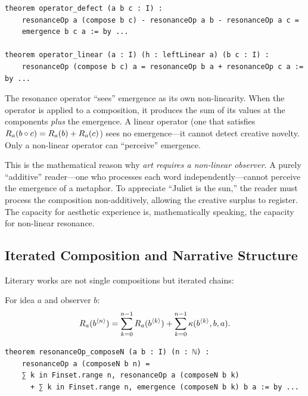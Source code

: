 \begin{lstlisting}[caption={Operator defect (IDT\_v3\_Emergence.lean)}]
theorem operator_defect (a b c : I) :
    resonanceOp a (compose b c) - resonanceOp a b - resonanceOp a c =
    emergence b c a := by ...

theorem operator_linear (a : I) (h : leftLinear a) (b c : I) :
    resonanceOp (compose b c) a = resonanceOp b a + resonanceOp c a := by ...
\end{lstlisting}

\begin{interpretation}
The resonance operator ``sees'' emergence as its own non-linearity. When the
operator is applied to a composition, it produces the sum of its values at
the components \emph{plus} the emergence. A linear operator (one that satisfies
$R_a(b \circ c) = R_a(b) + R_a(c)$) sees no emergence---it cannot detect
creative novelty. Only a non-linear operator can ``perceive'' emergence.

This is the mathematical reason why \emph{art requires a non-linear observer}.
A purely ``additive'' reader---one who processes each word independently---cannot
perceive the emergence of a metaphor. To appreciate ``Juliet is the sun,'' the
reader must process the composition non-additively, allowing the creative
surplus to register. The capacity for aesthetic experience is, mathematically
speaking, the capacity for non-linear resonance.
\end{interpretation}

\subsection{Iterated Composition and Narrative Structure}

Literary works are not single compositions but iterated chains:

\begin{theorem}
\label{thm:nfold-resonance-operator}
For idea $a$ and observer $b$:
\[
  R_a(b^{\langle n \rangle}) = \sum_{k=0}^{n-1} R_a(b^{\langle k \rangle}) + \sum_{k=0}^{n-1} \kappa(b^{\langle k \rangle}, b, a).
\]
\end{theorem}

\begin{lstlisting}[caption={N-fold resonance operator (IDT\_v3\_Emergence.lean)}]
theorem resonanceOp_composeN (a b : I) (n : ℕ) :
    resonanceOp a (composeN b n) =
    ∑ k in Finset.range n, resonanceOp a (composeN b k)
      + ∑ k in Finset.range n, emergence (composeN b k) b a := by ...
\end{lstlisting}

